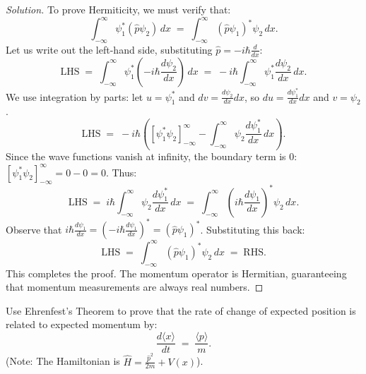 \documentclass[12pt, a4paper, twoside]{book}
\begin{document}
\begin{proof}[Solution]
To prove Hermiticity, we must verify that:
\[
  \int_{-\infty}^\infty \psi_1^* (\hat{p} \psi_2) \, dx \;=\; \int_{-\infty}^\infty (\hat{p} \psi_1)^* \psi_2 \, dx.
\]
Let us write out the left-hand side, substituting $\hat{p} = -i\hbar \frac{d}{dx}$:
\[
  \text{LHS} \;=\; \int_{-\infty}^\infty \psi_1^* \left( -i\hbar \frac{d\psi_2}{dx} \right) \, dx \;=\; -i\hbar \int_{-\infty}^\infty \psi_1^* \frac{d\psi_2}{dx} \, dx.
\]
We use integration by parts: let $u = \psi_1^*$ and $dv = \frac{d\psi_2}{dx} dx$, so $du = \frac{d\psi_1^*}{dx} dx$ and $v = \psi_2$.
\[
  \text{LHS} \;=\; -i\hbar \left( \left[ \psi_1^* \psi_2 \right]_{-\infty}^\infty - \int_{-\infty}^\infty \psi_2 \frac{d\psi_1^*}{dx} \, dx \right).
\]
Since the wave functions vanish at infinity, the boundary term is 0: $\left[ \psi_1^* \psi_2 \right]_{-\infty}^\infty = 0 - 0 = 0$. Thus:
\[
  \text{LHS} \;=\; i\hbar \int_{-\infty}^\infty \psi_2 \frac{d\psi_1^*}{dx} \, dx \;=\; \int_{-\infty}^\infty \left( i\hbar \frac{d\psi_1}{dx} \right)^* \psi_2 \, dx.
\]
Observe that $i\hbar \frac{d\psi_1}{dx} = \left( -i\hbar \frac{d\psi_1}{dx} \right)^* = (\hat{p} \psi_1)^*$.
Substituting this back:
\[
  \text{LHS} \;=\; \int_{-\infty}^\infty (\hat{p} \psi_1)^* \psi_2 \, dx \;=\; \text{RHS}.
\]
This completes the proof. The momentum operator is Hermitian, guaranteeing that momentum measurements are always real numbers.
\end{proof}

\begin{exercise}
Use Ehrenfest's Theorem to prove that the rate of change of expected position is related to expected momentum by:
\[
  \frac{d\langle x \rangle}{dt} \;=\; \frac{\langle p \rangle}{m}.
\]
(Note: The Hamiltonian is $\hat{H} = \frac{\hat{p}^2}{2m} + V(x)$).
\end{exercise}
\end{document}

